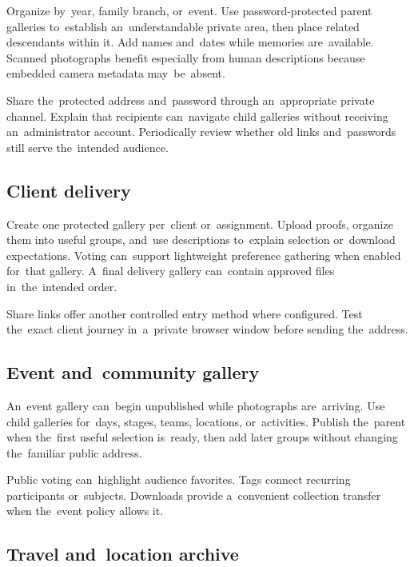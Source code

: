 \documentclass[11pt,a4paper]{article}
\begin{document}
Organize by~year, family branch, or~event. Use password-protected parent
galleries to~establish an~understandable private area, then place related
descendants within it. Add names and~dates while memories are~available. Scanned
photographs benefit especially from human descriptions because embedded camera
metadata may~be~absent.

Share the~protected address and~password through an~appropriate private channel.
Explain that recipients can~navigate child galleries without receiving
an~administrator account. Periodically review whether old links and~passwords
still serve the~intended audience.

\subsection{Client delivery}

Create one protected gallery per~client or~assignment. Upload proofs, organize
them into useful groups, and~use descriptions to~explain selection or~download
expectations. Voting can~support lightweight preference gathering when enabled
for~that gallery. A~final delivery gallery can~contain approved files
in~the~intended order.

Share links offer another controlled entry method where configured. Test
the~exact client journey in~a~private browser window before sending the~address.

\subsection{Event and~community gallery}

An~event gallery can~begin unpublished while photographs are~arriving. Use child
galleries for~days, stages, teams, locations, or~activities. Publish the~parent
when the~first useful selection is~ready, then add later groups without changing
the~familiar public address.

Public voting can~highlight audience favorites. Tags connect recurring
participants or~subjects. Downloads provide a~convenient collection transfer
when the~event policy allows it.

\subsection{Travel and~location archive}
\end{document}
